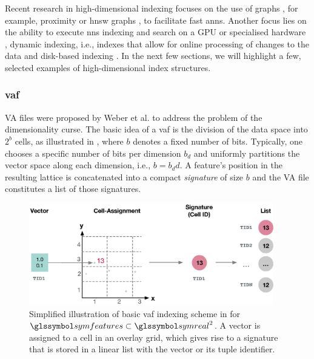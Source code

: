 Recent research in high-dimensional indexing focuses on the use of graphs \cite{Shimomura:2021Survey}, for example, proximity \cite{Zhao:2022Approximate} or \acrfull{hnsw} graphs \cite{Malkov:2018Efficient,Chen:2021SPANN}, to facilitate fast \acrshort{anns}. Another focus lies on the ability to execute \acrshort{nns} indexing and search on a GPU \cite{Johnson:2019Billion,Zhao:2020Song} or specialised hardware \cite{Lee:2022Anna}, dynamic indexing, i.e., indexes that allow for online processing of changes to the data \cite{Olafsson:2011Dynamic,Zhao:2022Approximate} and disk-based indexing \cite{Jayaram:2019DiskANN}. In the next few sections, we will highlight a few, selected examples of high-dimensional index structures.

\subsubsection{\texorpdfstring{\acrfull{vaf}}{Vector Approximation File (VAF)}}
\label{section:index_vaf}

VA files were proposed by Weber et al. \cite{Weber:1998Va} to address the problem of the dimensionality curse. The basic idea of a \acrshort{vaf} is the division of the data space into $2^b$ cells, as illustrated in , where $b$ denotes a fixed number of bits. Typically, one chooses a specific number of bits per dimension $b_d$ and uniformly partitions the vector space along each dimension, i.e., $b = b_dd$. A feature's position in the resulting lattice is concatenated into a compact \emph{signature} of size $b$ and the VA file constitutes a list of those signatures. 

\begin{figure}[tb]
\centering
\includegraphics[width=0.95\textwidth]{figures/vaf}
\caption{Simplified illustration of basic \acrshort{vaf} indexing scheme in for $\symfeatures \subset \symreal^2$. A vector is assigned to a cell in an overlay grid, which gives rise to a signature that is stored in a linear list with the vector or its tuple identifier.}
\label{fig:vaf}
\end{figure}

